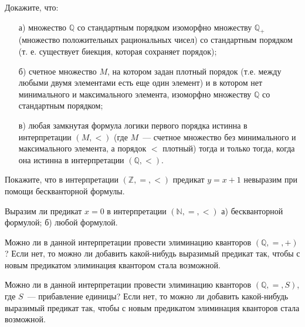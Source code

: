 
\begin{task}
    Докажите, что:
    \begin{enumerate}[topsep = 0pt, itemsep = -1ex]
        \item [а)] множество $\mathbb{Q}$ со стандартным порядком изоморфно множеству $\mathbb{Q}_{+}$ (множество положительных
		    рациональных чисел) со стандартным порядком (т. е. существует биекция, которая сохраняет порядок);
        \item [б)] счетное множество $M$, на котором задан плотный порядок (т.е. между любыми двумя элементами есть еще один
			элемент) и в котором нет минимального и максимального элемента, изоморфно множеству $\mathbb{Q}$ со стандартным
            порядком;
        \item [в)] любая замкнутая формула логики первого порядка истинна в интерпретации $(M, <)$ (где $M$~--- счетное множество
			без минимального и максимального элемента, а порядок $<$ плотный) тогда и только тогда, когда она истинна в
            интерпретации $(\mathbb{Q}, <)$.
    \end{enumerate}
\end{task}

\begin{task}
    Покажите, что в интерпретации $(\mathbb{Z}, =, <)$ предикат $y = x + 1$ невыразим при помощи бескванторной формулы.
\end{task}

\begin{task}
    Выразим ли предикат $x = 0$ в интерпретации $(\mathbb{N}, =, <)$ а) бескванторной формулой; б) любой формулой.
\end{task}

\begin{task}
    Можно ли в данной интерпретации провести элиминацию кванторов $(\mathbb{Q}, =, +)$? Если нет, то можно ли добавить какой-нибудь
    выразимый предикат так, чтобы с новым предикатом элиминация квантором стала возможной.
\end{task}

\begin{task}
    Можно ли в данной интерпретации провести элиминацию кванторов $(\mathbb{Q}, =, S)$, где $S$~--- прибавление единицы? Если нет,
    то можно ли добавить какой-нибудь выразимый предикат так, чтобы с новым предикатом элиминация кванторов стала возможной.
\end{task}
